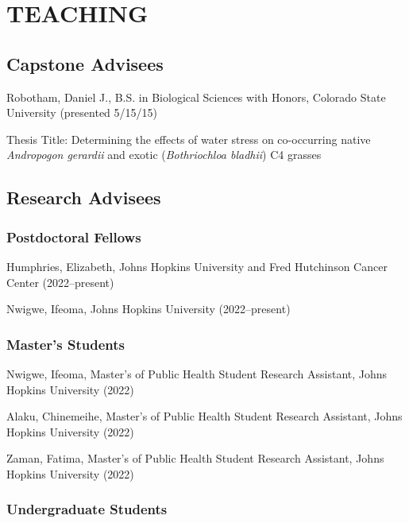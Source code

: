\documentclass{cv}
\begin{document}

\section*{TEACHING}


\subsection*{Capstone Advisees}

Robotham, Daniel J., B.S. in Biological Sciences with Honors, Colorado State University (presented 5/15/15)

Thesis Title: Determining the effects of water stress on co-occurring native \textit{Andropogon gerardii} and exotic (\textit{Bothriochloa bladhii}) C4 grasses

\subsection*{Research Advisees}

\subsubsection*{Postdoctoral Fellows}

Humphries, Elizabeth, Johns Hopkins University and Fred Hutchinson Cancer Center (2022--present)

Nwigwe, Ifeoma, Johns Hopkins University (2022--present)

\subsubsection*{Master's Students}

Nwigwe, Ifeoma, Master's of Public Health Student Research Assistant, Johns Hopkins University (2022)

Alaku, Chinemeihe, Master's of Public Health Student Research Assistant, Johns Hopkins University (2022)

Zaman, Fatima, Master's of Public Health Student Research Assistant, Johns Hopkins University (2022)

\subsubsection*{Undergraduate Students}
\end{document}
